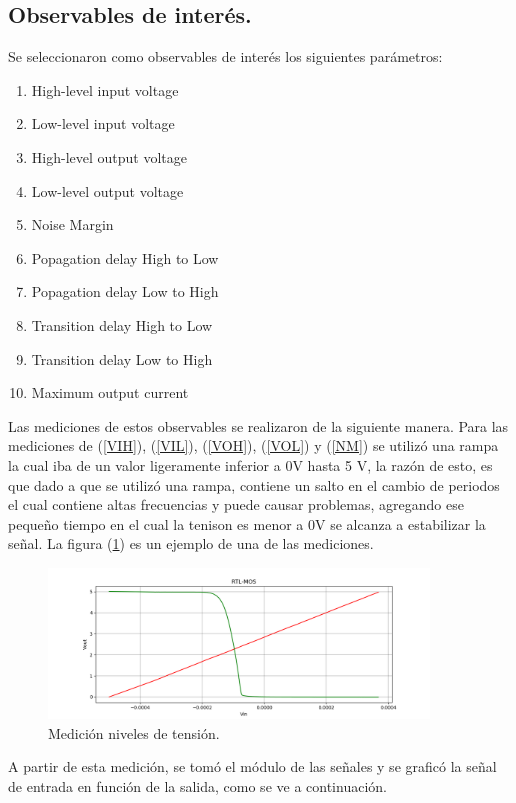 \subsection{Observables de interés.}
\label{sec:Obs}
Se seleccionaron como observables de interés los siguientes parámetros:
\begin{enumerate}
\item \label{VIH} High-level input voltage 
\item \label{VIL} Low-level input voltage
\item \label{VOH}High-level output voltage
\item \label{VOL} Low-level output voltage
\item \label{NM}Noise Margin
\item \label{PHL}Popagation delay High to Low
\item \label{PLH}Popagation delay Low to High
\item \label{THL}Transition delay High to Low
\item \label{TLH}Transition delay Low to High
\item \label{MOC}Maximum output current
\end{enumerate}
Las mediciones de estos observables se realizaron de la siguiente manera. Para las mediciones de (\ref{VIH}), (\ref{VIL}), (\ref{VOH}), (\ref{VOL}) y (\ref{NM}) se utilizó una rampa la cual iba de un valor ligeramente inferior  a 0V  hasta 5 V, la razón de esto, es que dado a que se utilizó una rampa, contiene un salto en el cambio de periodos el cual contiene altas frecuencias y puede causar problemas, agregando ese pequeño tiempo en el cual la tenison es menor a 0V se alcanza a estabilizar la señal. La figura (\ref{fig:medramp}) es un ejemplo de una de las mediciones.
\begin{figure}[H]	
	\centering
	\includegraphics[width=0.9\textwidth]{Imagenes/DC-SWEEP/MedicionRampa.PNG}
	\caption{Medición niveles de tensión.}
	\label{fig:medramp}
\end{figure}
A partir de esta medición, se tomó el módulo de las señales y se graficó la señal de entrada en función de la salida, como se ve a continuación.
